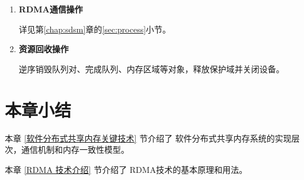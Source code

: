 {\begin{enumerate}[label=\textbf{步骤 \arabic*.}, leftmargin=0.5cm, align=left]
        \item \textbf{RDMA通信操作}

              详见第\ref{chap:sdsm}章的\ref{sec:process}小节。

        \item \textbf{资源回收操作}

              逆序销毁队列对、完成队列、内存区域等对象，释放保护域并关闭设备。
    \end{enumerate}

    \section{本章小结}

    本章 \ref{软件分布式共享内存关键技术} 节介绍了 软件分布式共享内存系统的实现层次，通信机制和内存一致性模型。

    本章 \ref{RDMA 技术介绍} 节介绍了 RDMA技术的基本原理和用法。
}